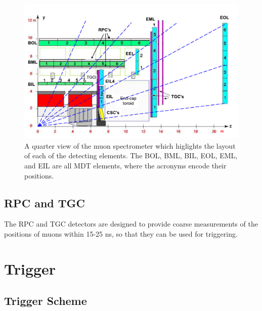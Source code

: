 \begin{figure}[hbtp]
\includegraphics[width=\fullfig]{figures/muon_side_schematic.pdf}
\caption{A quarter view of the muon spectrometer which higlights the layout of each of the detecting elements. The BOL, BML, BIL, EOL, EML, and EIL are all \ac{MDT} elements, where the acronyms encode their positions.}
\label{fig:muon_side_schematic}
\end{figure}

\subsection{\acl{RPC} and \acl{TGC}}

The \ac{RPC} and \ac{TGC} detectors are designed to provide coarse measurements of the positions of muons within 15-25 ns, so that they can be used for triggering.





\section{Trigger}
\label{sec:trigger}

\subsection{Trigger Scheme}

